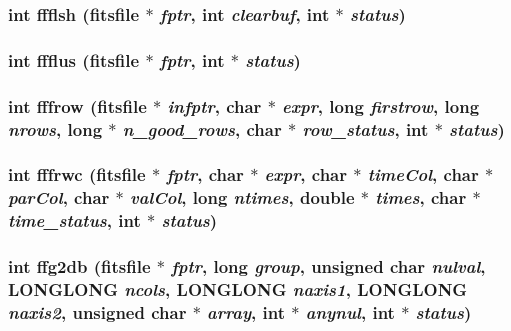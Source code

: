 \subsubsection{\setlength{\rightskip}{0pt plus 5cm}int ffflsh (\bf{fitsfile} $\ast$ {\em fptr}, int {\em clearbuf}, int $\ast$ {\em status})}\label{fitsio_8h_be4e54a1daa5329c828b6ad9b3bb9a76}


\subsubsection{\setlength{\rightskip}{0pt plus 5cm}int ffflus (\bf{fitsfile} $\ast$ {\em fptr}, int $\ast$ {\em status})}\label{fitsio_8h_dfee4024f70912aaaf7a9cae405114da}


\subsubsection{\setlength{\rightskip}{0pt plus 5cm}int fffrow (\bf{fitsfile} $\ast$ {\em infptr}, char $\ast$ {\em expr}, long {\em firstrow}, long {\em nrows}, long $\ast$ {\em n\_\-good\_\-rows}, char $\ast$ {\em row\_\-status}, int $\ast$ {\em status})}\label{fitsio_8h_1fc72ca968d2f0b3c5ccbe7bc1f96ff2}


\subsubsection{\setlength{\rightskip}{0pt plus 5cm}int fffrwc (\bf{fitsfile} $\ast$ {\em fptr}, char $\ast$ {\em expr}, char $\ast$ {\em time\-Col}, char $\ast$ {\em par\-Col}, char $\ast$ {\em val\-Col}, long {\em ntimes}, double $\ast$ {\em times}, char $\ast$ {\em time\_\-status}, int $\ast$ {\em status})}\label{fitsio_8h_8e8b1193adf49702fb19fac2df2e93af}


\subsubsection{\setlength{\rightskip}{0pt plus 5cm}int ffg2db (\bf{fitsfile} $\ast$ {\em fptr}, long {\em group}, unsigned char {\em nulval}, \bf{LONGLONG} {\em ncols}, \bf{LONGLONG} {\em naxis1}, \bf{LONGLONG} {\em naxis2}, unsigned char $\ast$ {\em array}, int $\ast$ {\em anynul}, int $\ast$ {\em status})}\label{fitsio_8h_9e5a172cb3e0331883d7b9d5a0b21bf3}


